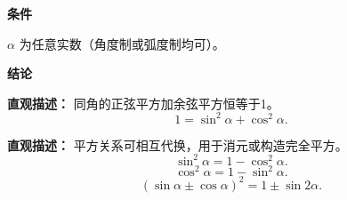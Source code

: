 \begin{statementbox}
	\textbf{\textcolor{CStatement}{条件}}
	\begin{description}[style=nextline, leftmargin=2.8em, labelsep=0.5em, itemsep=0.35em]
		\item[\textbf{\textcolor{CStatement}{条件1（任意角）：}}]
			$\alpha$ 为任意实数（角度制或弧度制均可）。
	\end{description}
	\textbf{\textcolor{CStatement}{结论}}
	\begin{description}[style=nextline, leftmargin=2.8em, labelsep=0.5em, itemsep=0.45em]
		\item[\textbf{\textcolor{CStatement}{结论一（平方恒等）：}}]
			\textbf{\textcolor{CStatement}{直观描述：}}
			同角的正弦平方加余弦平方恒等于1。
			\[
				1 = \sin^2\alpha + \cos^2\alpha.
			\]
		\item[\textbf{\textcolor{CStatement}{推广结论（常见变形）：}}]
			\textbf{\textcolor{CStatement}{直观描述：}}
			平方关系可相互代换，用于消元或构造完全平方。
			\[
				\sin^2\alpha = 1 - \cos^2\alpha.
			\]
			\[
				\cos^2\alpha = 1 - \sin^2\alpha.
			\]
			\[
				(\sin\alpha \pm \cos\alpha)^2 = 1 \pm \sin 2\alpha.
			\]
	\end{description}

\end{statementbox}
